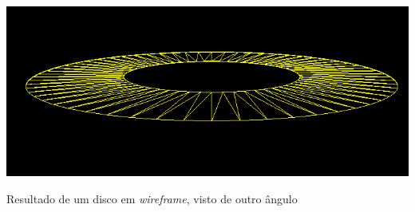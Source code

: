 \begin{center}
 	\includegraphics[width=\textwidth,height=0.5\textheight,keepaspectratio]{resources/disco2.png}
 	\captionsetup{type=figure, width=0.8\linewidth}
	\caption{Resultado de um disco em \emph{wireframe}, visto de outro ângulo}
\label{fig:sec1:disc:res2} 
\end{center}




